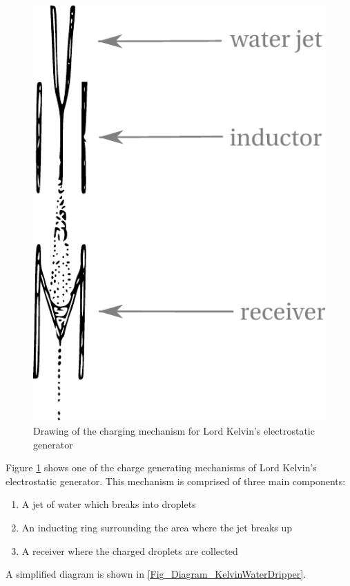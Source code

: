 \begin{figure}
    \centering
    \includegraphics[height=0.25\textheight]{content/appendices/chargedWaterDrops/graphics/Figure_Drawing_KelvinWaterDripper_ChargingMechanism}
    \caption{Drawing of the charging mechanism for Lord Kelvin's electrostatic
generator}
    \label{Figure_Drawing_KelvinWaterDripper_ChargingMechanism}
\end{figure}
Figure \ref{Figure_Drawing_KelvinWaterDripper_ChargingMechanism} shows one of the charge generating mechanisms of Lord Kelvin's electrostatic generator.
This mechanism is comprised of three main components:
\begin{enumerate}
\item A jet of water which breaks into droplets
\item An inducting ring surrounding the area where the jet breaks up
\item A receiver where the charged droplets are collected
\end{enumerate}
A simplified diagram is shown in \cref{Fig_Diagram_KelvinWaterDripper}.
